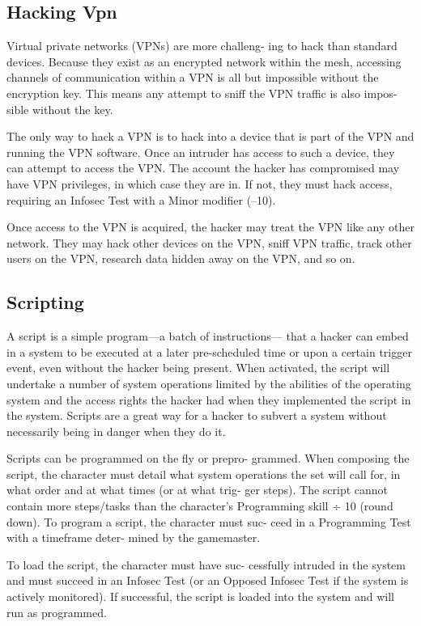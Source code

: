 \subsection{Hacking Vpn}

Virtual private networks (VPNs) are more challeng-
ing to hack than standard devices. Because they exist 
as an encrypted network within the mesh, accessing 
channels of communication within a VPN is all but 
impossible without the encryption key. This means 
any attempt to sniff the VPN traffic is also impos-
sible without the key.

The only way to hack a VPN is to hack into a 
device that is part of the VPN and running the VPN 
software. Once an intruder has access to such a device, 
they can attempt to access the VPN. The account the 
hacker has compromised may have VPN privileges, in 
which case they are in. If not, they must hack access, 
requiring an Infosec Test with a Minor modifier (–10).

Once access to the VPN is acquired, the hacker may 
treat the VPN like any other network. They may hack 
other devices on the VPN, sniff VPN traffic,  track 
other users on the VPN, research data hidden away 
on the VPN, and so on.

\subsection{Scripting}

A script is a simple program—a batch of instructions—
that a hacker can embed in a system to be executed at 
a later pre-scheduled time or upon a certain trigger 
event, even without the hacker being present. When 
activated, the script will undertake a number of system 
operations limited by the abilities of the operating 
system and the access rights the hacker had when 
they implemented the script in the system. Scripts are 
a great way for a hacker to subvert a system without 
necessarily being in danger when they do it.

Scripts can be programmed on the fly or prepro-
grammed. When composing the script, the character 
must detail what system operations the set will call 
for, in what order and at what times (or at what trig-
ger steps). The script cannot contain more steps/tasks 
than the character's Programming skill ÷ 10 (round 
down). To program a script, the character must suc-
ceed in a Programming Test with a timeframe deter-
mined by the gamemaster.

To load the script, the character must have suc-
cessfully intruded in the system and must succeed 
in an Infosec Test (or an Opposed Infosec Test if the 
system is actively monitored). If successful, the script 
is loaded into the system and will run as programmed.

